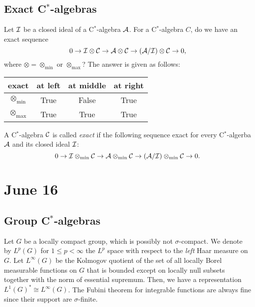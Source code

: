 \documentclass{../../../small}
\begin{document}
\subsection{Exact C$^*$-algebras}


Let $\mathcal{I}$ be a closed ideal of a C$^*$-algebra $\mathcal{A}$.
For a C$^*$-algebra $C$, do we have an exact sequence
\[0\to\mathcal{I}\otimes\mathcal{C}\to\mathcal{A}\otimes\mathcal{C}\to(\mathcal{A}/\mathcal{I})\otimes\mathcal{C}\to0,\]
where $\otimes=\otimes_{\min}$ or $\otimes_{\max}$?
The answer is given as follows:
\begin{center}
\begin{tabular}{c|ccc}
exact&at left&at middle&at right\\\hline
$\otimes_{\min}$&True&False&True\\
$\otimes_{\max}$&True&True&True
\end{tabular}
\end{center}

\begin{defn}
A C$^*$-algebra $\mathcal{C}$ is called \emph{exact} if the following sequence exact for every C$^*$-algerba $\mathcal{A}$ and its closed ideal $\mathcal{I}$:
\[0\to\mathcal{I}\otimes_{\min}\mathcal{C}\to\mathcal{A}\otimes_{\min}\mathcal{C}\to(\mathcal{A}/\mathcal{I})\otimes_{\min}\mathcal{C}\to0.\]
\end{defn}

\iffalse
\[(\cA/\cI)\otimes_\alpha\cB\xrightarrow{\sim}\frac{\cA\otimes_{\max}\cB}{\cI\otimes_{\max}\cB}\to(\cA/\cI)\otimes_{\max}\cB.\]
\fi











\newpage
\section{June 16}

\subsection{Group C$^*$-algebras}

Let $G$ be a locally compact group, which is possibly not $\sigma$-compact.
We denote by $L^p(G)$ for $1\le p<\infty$ the $L^p$ space with respect to the \emph{left} Haar measure on $G$.
Let $L^\infty(G)$ be the Kolmogov quotient of the set of all locally Borel measurable functions on $G$ that is bounded except on locally null subsets together with the norm of essential supremum.
Then, we have a representation $L^1(G)^*\cong L^\infty(G)$.
The Fubini theorem for integrable functions are always fine since their support are $\sigma$-finite.
\end{document}
